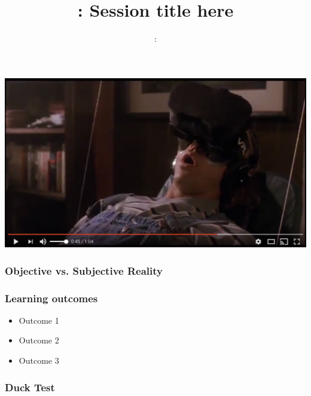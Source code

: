 \usepackage{../../beamerthemeFalmouthGamesAcademy}
\usepackage{multimedia}
\graphicspath{ {../../} }


\usepackage[normalem]{ulem}
\usepackage{wasysym}

\usepackage{pdfpages}

\usetikzlibrary{arrows,automata}




\title{\sessionnumber: Session title here}
\subtitle{\modulecode: \moduletitle}

\frame{\titlepage} 


\begin{frame}
	\begin{center}
		\href{https://www.youtube.com/watch?v=gvozcv8pS3c}{ \includegraphics[scale=.3]{assets/mower}  }
	\end{center}
\end{frame}

\begin{frame}
	\frametitle{Objective vs. Subjective Reality}
	
\end{frame}

\begin{frame}
	\frametitle{Learning outcomes}
	\begin{itemize}
		\item Outcome 1
		\item Outcome 2
		\item Outcome 3
	\end{itemize}
\end{frame}

\begin{frame}
	\frametitle{Duck Test}
	
\end{frame}
	

\begin{frame}
\end{frame}




